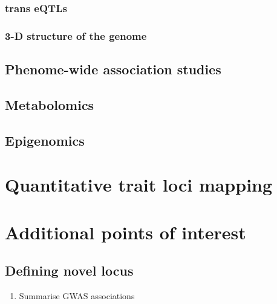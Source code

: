 \documentclass[
]{book}
\providecommand{\tightlist}{%
  \setlength{\itemsep}{0pt}\setlength{\parskip}{0pt}}
\begin{document}
\hypertarget{trans-eqtls}{%
\subsection{trans eQTLs}\label{trans-eqtls}}

\hypertarget{d-structure-of-the-genome}{%
\subsection{3-D structure of the genome}\label{d-structure-of-the-genome}}

\hypertarget{phenome-wide-association-studies}{%
\section{Phenome-wide association studies}\label{phenome-wide-association-studies}}

\hypertarget{metabolomics}{%
\section{Metabolomics}\label{metabolomics}}

\hypertarget{epigenomics}{%
\section{Epigenomics}\label{epigenomics}}

\hypertarget{quantitative-trait-loci-mapping}{%
\chapter{Quantitative trait loci mapping}\label{quantitative-trait-loci-mapping}}

\hypertarget{additional-points-of-interest}{%
\chapter{Additional points of interest}\label{additional-points-of-interest}}

\hypertarget{defining-novel-locus}{%
\section{Defining novel locus}\label{defining-novel-locus}}

\begin{enumerate}
\def\labelenumi{\arabic{enumi}.}
\tightlist
\item
  Summarise GWAS associations
\end{enumerate}
\end{document}
